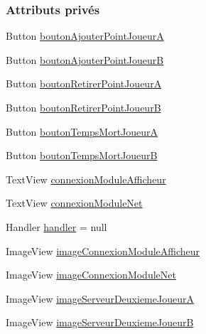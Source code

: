 \subsubsection*{Attributs privés}
\begin{DoxyCompactItemize}
\item 
Button \hyperlink{classcom_1_1example_1_1area_1_1_i_h_m_gestion_partie_aa99f420624fb6c990516b30ebe0805cc}{bouton\+Ajouter\+Point\+JoueurA}
\item 
Button \hyperlink{classcom_1_1example_1_1area_1_1_i_h_m_gestion_partie_a8381630a907132144271c11cba2dce20}{bouton\+Ajouter\+Point\+JoueurB}
\item 
Button \hyperlink{classcom_1_1example_1_1area_1_1_i_h_m_gestion_partie_af59fb470e464a16a7f09f4440b18c2e8}{bouton\+Retirer\+Point\+JoueurA}
\item 
Button \hyperlink{classcom_1_1example_1_1area_1_1_i_h_m_gestion_partie_a198ecded9484cec42303eb70246bd590}{bouton\+Retirer\+Point\+JoueurB}
\item 
Button \hyperlink{classcom_1_1example_1_1area_1_1_i_h_m_gestion_partie_a1014526b0dcc0266e184dc2787fbeeef}{bouton\+Temps\+Mort\+JoueurA}
\item 
Button \hyperlink{classcom_1_1example_1_1area_1_1_i_h_m_gestion_partie_a35331b85b4b0acc71a4ede7c78819bc0}{bouton\+Temps\+Mort\+JoueurB}
\item 
Text\+View \hyperlink{classcom_1_1example_1_1area_1_1_i_h_m_gestion_partie_a77e3d7f58799c309694b3ccbb3318150}{connexion\+Module\+Afficheur}
\item 
Text\+View \hyperlink{classcom_1_1example_1_1area_1_1_i_h_m_gestion_partie_a80163f148ea0264b5395a7c55ee5b4ed}{connexion\+Module\+Net}
\item 
Handler \hyperlink{classcom_1_1example_1_1area_1_1_i_h_m_gestion_partie_ace8429e695c3e7d695ba98bf2dcd66f2}{handler} = null
\item 
Image\+View \hyperlink{classcom_1_1example_1_1area_1_1_i_h_m_gestion_partie_aae13761712b67eac1e69ac900c265ffc}{image\+Connexion\+Module\+Afficheur}
\item 
Image\+View \hyperlink{classcom_1_1example_1_1area_1_1_i_h_m_gestion_partie_a98c578b0056e17278e27aacefa933952}{image\+Connexion\+Module\+Net}
\item 
Image\+View \hyperlink{classcom_1_1example_1_1area_1_1_i_h_m_gestion_partie_ad66029deaf2045f16e86ed6059501a1a}{image\+Serveur\+Deuxieme\+JoueurA}
\item 
Image\+View \hyperlink{classcom_1_1example_1_1area_1_1_i_h_m_gestion_partie_a543e5c8605174e111ada0719a0d86fe1}{image\+Serveur\+Deuxieme\+JoueurB}

\end{DoxyCompactItemize}
